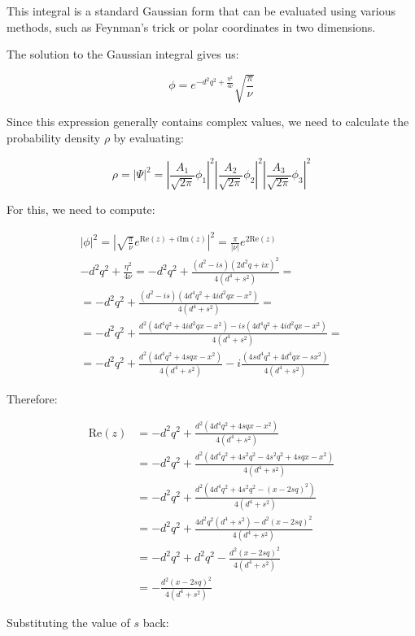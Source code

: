 This integral is a standard Gaussian form that can be evaluated using various methods, such as Feynman's trick or polar coordinates in two dimensions.


The solution to the Gaussian integral gives us:

\begin{equation}
\phi = e^{-d^2q^2+\frac{\eta^2}{4\nu}}\sqrt{\frac{\pi}{\nu}}
\end{equation}

Since this expression generally contains complex values, we need to calculate the probability density $\rho$ by evaluating:

\begin{equation}
\rho = |\Psi|^2 = \left|\frac{A_1}{\sqrt{2\pi}}\phi_1\right|^2\left|\frac{A_2}{\sqrt{2\pi}}\phi_2\right|^2\left|\frac{A_3}{\sqrt{2\pi}}\phi_3\right|^2
\end{equation}

For this, we need to compute:

\begin{gather}
|\phi|^2 = \left|\sqrt{\frac{\pi}{\nu}}e^{\text{Re}(z)+i\text{Im}(z)}\right|^2 = \frac{\pi}{|\nu|}e^{2\text{Re}(z)}  \\
-d^2q^2+\frac{\eta^2}{4\nu} = -d^2q^2+\frac{(d^2-is)(2d^2q+ix)^2}{4(d^4+s^2)} = \\
= -d^2q^2+\frac{(d^2-is)(4d^4q^2+4id^2qx-x^2)}{4(d^4+s^2)} = \\
= -d^2q^2+\frac{d^2(4d^4q^2+4id^2qx-x^2)-is(4d^4q^2+4id^2qx-x^2)}{4(d^4+s^2)} =  \\
= -d^2q^2+\frac{d^2(4d^4q^2+4sqx-x^2)}{4(d^4+s^2)}-i\frac{(4sd^4q^2+4d^4qx-sx^2)}{4(d^4+s^2)}
\end{gather}

Therefore:

\begin{align}
\text{Re}(z) &= -d^2q^2+\frac{d^2(4d^4q^2+4sqx-x^2)}{4(d^4+s^2)} \\
&= -d^2q^2+\frac{d^2(4d^4q^2+4s^2q^2-4s^2q^2+4sqx-x^2)}{4(d^4+s^2)} \\
&= -d^2q^2+\frac{d^2(4d^4q^2+4s^2q^2-(x-2sq)^2)}{4(d^4+s^2)} \\
&= -d^2q^2+\frac{4d^2q^2(d^4+s^2)-d^2(x-2sq)^2}{4(d^4+s^2)}  \\
&= -d^2q^2+d^2q^2-\frac{d^2(x-2sq)^2}{4(d^4+s^2)} \\
&= -\frac{d^2(x-2sq)^2}{4(d^4+s^2)}
\end{align}

Substituting the value of $s$ back:

